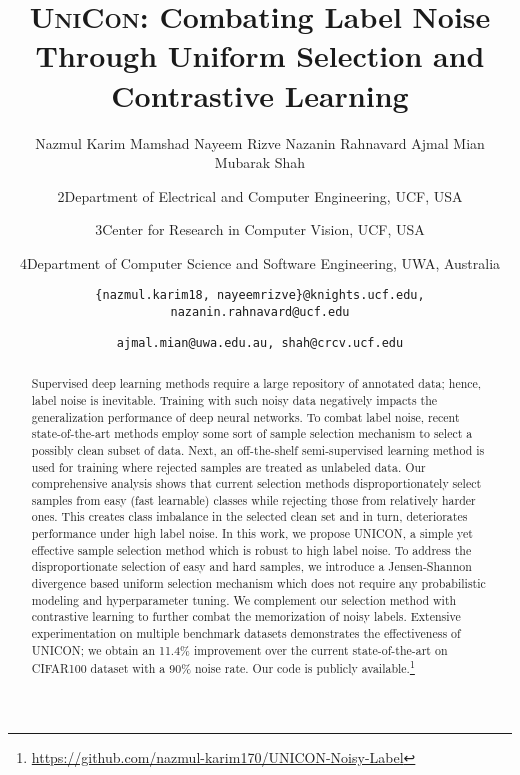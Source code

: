 \documentclass[10pt,twocolumn,letterpaper]{article}
\begin{document}
\title{
\textsc{UniCon}: Combating Label Noise Through Uniform Selection and Contrastive Learning\\


}



\author{Nazmul Karim \hspace{2mm} Mamshad Nayeem Rizve \hspace{2mm} Nazanin Rahnavard \hspace{2mm} Ajmal Mian \hspace{2mm} Mubarak Shah \and
{\normalsize \IEEEauthorrefmark2Department of Electrical and Computer Engineering, UCF, USA}\and{\normalsize \IEEEauthorrefmark3Center for Research in Computer Vision, UCF, USA}\and{\normalsize \IEEEauthorrefmark4Department of Computer Science and Software Engineering, UWA, Australia}\and
\texttt{\small \{nazmul.karim18, nayeemrizve\}@knights.ucf.edu, nazanin.rahnavard@ucf.edu}\and \texttt{\small ajmal.mian@uwa.edu.au,
shah@crcv.ucf.edu}}

\maketitle

\begin{abstract}
\vspace{-4mm}


Supervised deep learning methods require a large repository of annotated data; hence, label noise is inevitable.
Training with such noisy data negatively impacts the generalization performance of deep neural networks. To combat
label noise, recent state-of-the-art methods employ some
sort of sample selection mechanism to select a possibly
clean subset of data. Next, an off-the-shelf semi-supervised
learning method is used for training where rejected samples
are treated as unlabeled data. Our comprehensive analysis
shows that current selection methods disproportionately select samples from easy (fast learnable) classes while rejecting
those from relatively harder ones. This creates class imbalance in the selected clean set and in turn, deteriorates performance under high label noise. In this work, we propose
UNICON, a simple yet effective sample selection method
which is robust to high label noise. To address the disproportionate selection of easy and hard samples, we introduce a Jensen-Shannon divergence based uniform selection
mechanism which does not require any probabilistic modeling and hyperparameter tuning. We complement our selection method with contrastive learning to further combat
the memorization of noisy labels. Extensive experimentation on
multiple benchmark datasets demonstrates the effectiveness
of UNICON; we obtain an 11.4\% improvement over the current state-of-the-art on CIFAR100 dataset with a 90\% noise
rate. Our code is publicly available.\footnote{\url{https://github.com/nazmul-karim170/UNICON-Noisy-Label}}

\end{abstract}
\end{document}

